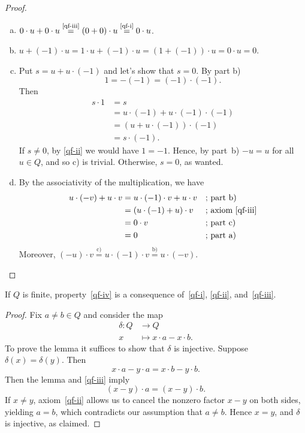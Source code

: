 \begin{proof}${}$
    \begin{enumerate}[a)]
        \item
        $0\cdot u+0\cdot u\stackrel{\text{\ref{qf-iii}}}=
                (0+0)\cdot u \stackrel{\text{\ref{qf-i}}}= 0\cdot u
        $.
        \item $u + (-1)\cdot u=1\cdot u+(-1)\cdot u=(1+(-1))\cdot u
            = 0\cdot u = 0$.
        \item Put $s=u+u\cdot(-1)$ and let's show that $s=0$. By part b)
        \[
            1=-(-1)=(-1)\cdot(-1).
        \]
        Then
        \begin{align*}
            s\cdot1 &= s\\
                &= u\cdot(-1)+u\cdot(-1)\cdot(-1)\\
                &= (u+u\cdot(-1))\cdot(-1)\\
                &= s\cdot(-1).
        \end{align*}
        If $s\ne0$, by \ref{qf-ii} we would have $1=-1$. Hence, by part~b) $-u=u$ for all $u\in Q$, and so c) is trivial. Otherwise, $s=0$, as wanted.
        \item By the associativity of the multiplication, we have
        \begin{align*}
            u\cdot(-v)+u\cdot v &= u\cdot(-1)\cdot v+u\cdot v
                    &&\text{; part b)}\\
                &= (u\cdot(-1)+u)\cdot v
                    &&\text{; axiom~\ref{qf-iii}}\\
                &= 0\cdot v
                    &&\text{; part c)}\\
                &= 0
                    &&\text{; part a)}
        \end{align*}
        Moreover, $(-u)\cdot v\stackrel{\text{c)}}=u\cdot(-1)\cdot v
        \stackrel{\text{b)}}= u\cdot(-v)$.
    \end{enumerate}
    
\end{proof}

\begin{prop}
    If\/ $Q$ is finite, property\/~\ref{qf-iv} is a consequence of\/~\ref{qf-i}, \ref{qf-ii}, and\/~\ref{qf-iii}.
\end{prop}

\begin{proof}
    Fix $a\ne b\in Q$ and consider the map
    \begin{align*}
        \delta\colon Q&\to Q\\
        x&\mapsto x\cdot a-x\cdot b.
    \end{align*}
    To prove the lemma it suffices to show that $\delta$ is injective. Suppose $\delta(x)=\delta(y)$. Then
    \[
        x\cdot a-y\cdot a=x\cdot b-y\cdot b.
    \]
    Then the lemma and \ref{qf-iii} imply
    \[
        (x-y)\cdot a=(x-y)\cdot b.
    \]
    If $x\ne y$, axiom~\ref{qf-ii} allows us to cancel the nonzero factor $x-y$ on both sides, yielding $a=b$, which contradicts our assumption that $a\ne b$. Hence $x=y$, and $\delta$ is injective, as claimed.
\end{proof}

